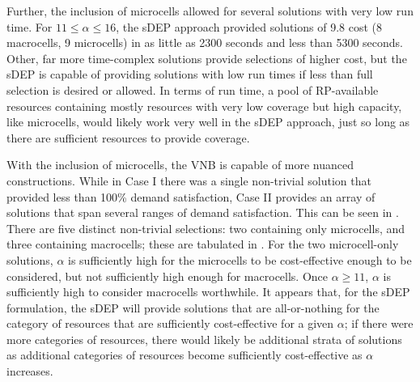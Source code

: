 \documentclass[12pt,dvipsnames]{report}
\begin{document}
Further, the inclusion of microcells allowed for several solutions with very low run time.  For $11 \leq \alpha \leq 16$, the sDEP approach provided solutions of 9.8 cost (8 macrocells, 9 microcells) in as little as 2300 seconds and less than 5300 seconds.  Other, far more time-complex solutions provide selections of higher cost, but the sDEP is capable of providing solutions with low run times if less than full selection is desired or allowed.  In terms of run time, a pool of RP-available resources containing mostly resources with very low coverage but high capacity, like microcells, would likely work very well in the sDEP approach, just so long as there are sufficient resources to provide coverage.

With the inclusion of microcells, the VNB is capable of more nuanced constructions.  While in Case I there was a single non-trivial solution that provided less than 100\% demand satisfaction, Case II provides an array of solutions that span several ranges of demand satisfaction.  This can be seen in .  There are five distinct non-trivial selections: two containing only microcells, and three containing macrocells; these are tabulated in .  For the two microcell-only solutions, $\alpha$ is sufficiently high for the microcells to be cost-effective enough to be considered, but not sufficiently high enough for macrocells.  Once $\alpha \geq 11$, $\alpha$ is sufficiently high to consider macrocells worthwhile.  It appears that, for the sDEP formulation, the sDEP will provide solutions that are all-or-nothing for the category of resources that are sufficiently cost-effective for a given $\alpha$; if there were more categories of resources, there would likely be additional strata of solutions as additional categories of resources become sufficiently cost-effective as $\alpha$ increases.
\end{document}
